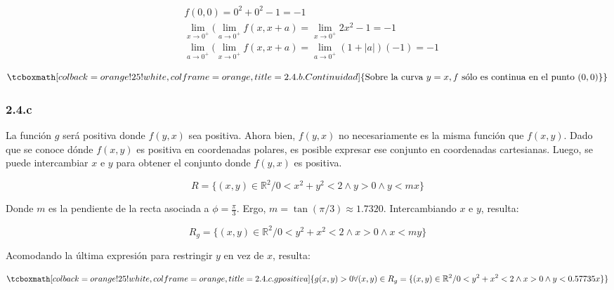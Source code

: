 \documentclass{article}
\renewcommand{\Bbb}{\mathbb}
\begin{document}
\begin{subequations}
\begin{align}
& f(0, 0) = 0^2 + 0^2 - 1 = -1 \\
& \lim_{x \rightarrow 0^+} ( \lim_{a \rightarrow 0^+} f(x, x+a) = \lim_{x \rightarrow 0^+} 2x^2 - 1 = -1 \\
& \lim_{a \rightarrow 0^+} ( \lim_{x \rightarrow 0^+} f(x, x+a) = \lim_{a \rightarrow 0^+} (1 + |a|) (-1) = -1
\end{align}
\end{subequations}

\begin{equation}
\tcboxmath[colback=orange!25!white,colframe=orange,title=2.4.b. Continuidad]
{ \text{Sobre la curva } y = x, f \text{ sólo es continua en el punto } (0, 0) \} }
\end{equation}

\subsubsection*{2.4.c}
\label{subsubsec:2.4.c}

La función $g$ será positiva donde $f(y,x)$ sea positiva. Ahora bien, $f(y,x)$ no necesariamente es la misma función que $f(x,y)$. Dado que se conoce dónde $f(x,y)$ es positiva en coordenadas polares, es posible expresar ese conjunto en coordenadas cartesianas. Luego, se puede intercambiar $x$ e $y$ para obtener el conjunto donde $f(y,x)$ es positiva. 

\begin{equation}
R = \{ (x,y) \in \Bbb R^2 / 0 < x^2 + y^2 < 2 \wedge y > 0 \wedge y < m x \}
\end{equation}

Donde $m$ es la pendiente de la recta asociada a $\phi = \frac{\pi}{3}$. Ergo, $m = \tan(\pi/3) \approx 1.7320$. Intercambiando $x$ e $y$, resulta:

\begin{equation}
R_g = \{ (x,y) \in \Bbb R^2 / 0 < y^2 + x^2 < 2 \wedge x > 0 \wedge x < m y \}
\end{equation}

Acomodando la última expresión para restringir $y$ en vez de $x$, resulta:

\begin{equation}
\tcboxmath[colback=orange!25!white,colframe=orange,title=2.4.c. g positiva ]
{
 g(x,y) > 0 \forall (x,y) \in R_g = \{ (x,y) \in \Bbb R^2 / 0 < y^2 + x^2 < 2 \wedge x > 0 \wedge y < 0.57735 x \} 
}
\end{equation}
\end{document}
